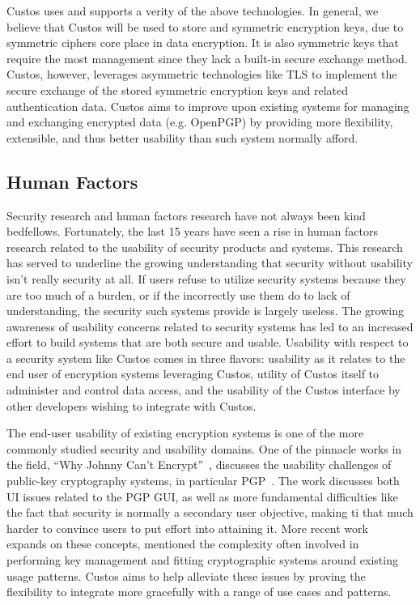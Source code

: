 Custos uses and supports a verity of the above technologies. In
general, we believe that Custos will be used to store and symmetric
encryption keys, due to symmetric ciphers core place in data
encryption. It is also symmetric keys that require the most management
since they lack a built-in secure exchange method. Custos, however,
leverages asymmetric technologies like TLS to implement the secure
exchange of the stored symmetric encryption keys and related
authentication data. Custos aims to improve upon existing systems for
managing and exchanging encrypted data (e.g. OpenPGP) by providing
more flexibility, extensible, and thus better usability than such
system normally afford.


\subsection{Human Factors}

Security research and human factors research have not always been kind
bedfellows. Fortunately, the last 15 years have seen a rise in human
factors research related to the usability of security products and
systems. This research has served to underline the growing
understanding that security without usability isn't really security at
all. If users refuse to utilize security systems because they are too
much of a burden, or if the incorrectly use them do to lack of
understanding, the security such systems provide is largely
useless. The growing awareness of usability concerns related to
security systems has led to an increased effort to build systems that
are both secure and usable. Usability with respect to a security
system like Custos comes in three flavors: usability as it relates to
the end user of encryption systems leveraging Custos, utility of
Custos itself to administer and control data access, and the usability
of the Custos interface by other developers wishing to integrate with
Custos.

The end-user usability of existing encryption systems is one of the
more commonly studied security and usability domains. One of the
pinnacle works in the field, ``Why Johnny Can't
Encrypt''~\cite{Whitten1998, Whitten1998}, discusses the usability
challenges of public-key cryptography systems, in particular
PGP~\cite{openpgp}. The work discusses both UI issues related to the
PGP GUI, as well as more fundamental difficulties like the fact that
security is normally a secondary user objective, making ti that much
harder to convince users to put effort into attaining it. More recent
work~\cite{Sweikata2009, Furnell2006, Ibrahim2010} expands on these
concepts, mentioned the complexity often involved in performing key
management and fitting cryptographic systems around existing usage
patterns. Custos aims to help alleviate these issues by proving the
flexibility to integrate more gracefully with a range of use cases and
patterns.

